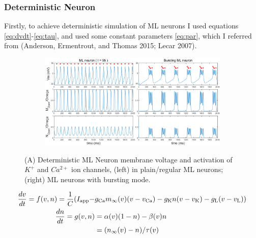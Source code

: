 \documentclass[
]{article}
\begin{document}
\hypertarget{MLdt}{%
\subsubsection{Deterministic Neuron}\label{MLdt}}

Firstly, to achieve deterministic simulation of ML neurons I used equations \eqref{eq:dvdt}-\eqref{eq:tau}, and used some constant parameters \eqref{eq:par}, which I referred from (Anderson, Ermentrout, and Thomas 2015; Lecar 2007).

\begin{figure}
  \captionsetup[subfigure]{labelformat=empty} \centering
  \begin{subfigure}[b]{0.75\textwidth}
    \includegraphics[width=\textwidth]{figs/F0_A_ML_channel_det.png}
    \caption{} \label{fig:fig0dt}
  \end{subfigure}
  \vspace{-0.75cm}
  \caption{(A) Deterministic ML Neuron membrane voltage and activation of $K^+$ and $Ca^{2+}$ ion channels, (left) in plain/regular ML neurons; (right) ML neurons with bursting mode.}
\end{figure}

\begin{align} 
\label{eq:dvdt} \frac{dv}{dt} = f(v,n) = 
    \frac1C ( I_{\rm app} - &g_{\rm Ca} m_\infty (v) (v - v_{\rm Ca}) - 
    g_{\rm K} n (v - v_{\rm K}) - g_{\rm L}(v - v_{\rm L}) ) \\
\nonumber \frac{dn}{dt}  =  g(v,n) &= \alpha(v)(1-n) - \beta(v)n \\
\label{eq:dndt} &= (n_\infty(v)-n)/\tau(v)
\end{align}
\end{document}
